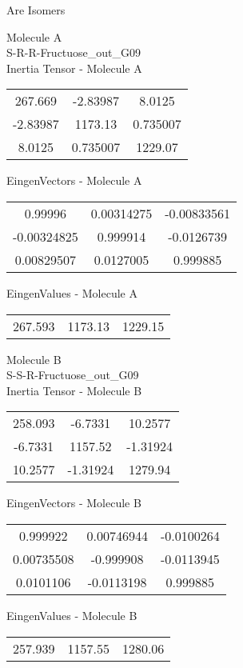 \begin{center}
\vtab
\vtab
\textcolor{NavyBlue}{\Large Are Isomers}
\end{center}
\newpage
\begin{multicols}{2}
\begin{center}
Molecule A \\ 
S-R-R-Fructuose\_out\_G09
\\
Inertia Tensor - Molecule A \\
\vtab
\begin{tabular}{|c c c|}
267.669	 & 	-2.83987	 & 	8.0125	 \\
-2.83987	 & 	1173.13	 & 	0.735007	 \\
8.0125	 & 	0.735007	 & 	1229.07
\end{tabular}

\vtab
 EingenVectors - Molecule A     \\
\vtab
\begin{tabular}{|c c c|}
0.99996	 & 	0.00314275	 & 	-0.00833561	 \\
-0.00324825	 & 	0.999914	 & 	-0.0126739	 \\
0.00829507	 & 	0.0127005	 & 	0.999885
\end{tabular}

\vtab
 EingenValues - Molecule A     \\
\vtab
\begin{tabular}{|c c c|}
267.593	 & 	1173.13	 & 	1229.15
\end{tabular}
\columnbreak

Molecule B \\ 
S-S-R-Fructuose\_out\_G09
\\
Inertia Tensor - Molecule B \\
\vtab
\begin{tabular}{|c c c|}
258.093	 & 	-6.7331	 & 	10.2577	 \\
-6.7331	 & 	1157.52	 & 	-1.31924	 \\
10.2577	 & 	-1.31924	 & 	1279.94
\end{tabular}

\vtab
 EingenVectors - Molecule B     \\
\vtab
\begin{tabular}{|c c c|}
0.999922	 & 	0.00746944	 & 	-0.0100264	 \\
0.00735508	 & 	-0.999908	 & 	-0.0113945	 \\
0.0101106	 & 	-0.0113198	 & 	0.999885
\end{tabular}

\vtab
 EingenValues - Molecule B     \\
\vtab
\begin{tabular}{|c c c|}
257.939	 & 	1157.55	 & 	1280.06
\end{tabular}

\end{center}
\end{multicols}
